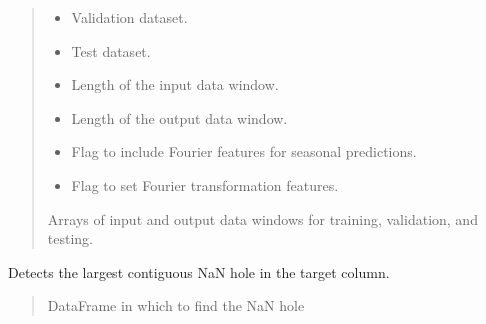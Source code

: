 \documentclass[letterpaper,10pt,english]{sphinxmanual}
\begin{document}
\begin{fulllineitems}
\begin{fulllineitems}
\begin{quote}
\begin{description}
\begin{itemize}
\item {} 
\sphinxAtStartPar
{} \textendash{} Validation dataset.

\item {} 
\sphinxAtStartPar
{} \textendash{} Test dataset.

\item {} 
\sphinxAtStartPar
{} \textendash{} Length of the input data window.

\item {} 
\sphinxAtStartPar
{} \textendash{} Length of the output data window.

\item {} 
\sphinxAtStartPar
{} \textendash{} Flag to include Fourier features for seasonal predictions.

\item {} 
\sphinxAtStartPar
{} \textendash{} Flag to set Fourier transformation features.

\end{itemize}

\sphinxAtStartPar
Arrays of input and output data windows for training, validation, and testing.

\end{description}\end{quote}

\end{fulllineitems}


\begin{fulllineitems}
\label{\detokenize{docs/data_preprocessing:data_preprocessing.DataPreprocessor.detect_nan_hole}}
\pysigstartsignatures
{}
\pysigstopsignatures
\sphinxAtStartPar
Detects the largest contiguous NaN hole in the target column.
\begin{quote}\begin{description}
\sphinxAtStartPar
{} \textendash{} DataFrame in which to find the NaN hole


\end{description}
\end{quote}
\end{fulllineitems}
\end{fulllineitems}
\end{document}
